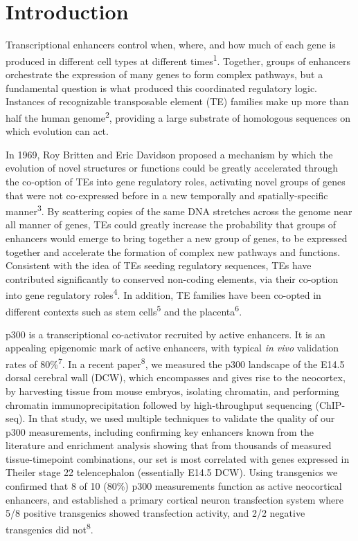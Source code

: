 \documentclass[]{article}
\begin{document}
\section{\texorpdfstring{\\
Introduction}{ Introduction}}\label{introduction}

Transcriptional enhancers control when, where, and how much of each gene
is produced in different cell types at different
times\textsuperscript{1}. Together, groups of enhancers orchestrate the
expression of many genes to form complex pathways, but a fundamental
question is what produced this coordinated regulatory logic. Instances
of recognizable transposable element (TE) families make up more than
half the human genome\textsuperscript{2}, providing a large substrate of
homologous sequences on which evolution can act.

In 1969, Roy Britten and Eric Davidson proposed a mechanism by which the
evolution of novel structures or functions could be greatly accelerated
through the co-option of TEs into gene regulatory roles, activating
novel groups of genes that were not co-expressed before in a new
temporally and spatially-specific manner\textsuperscript{3}. By
scattering copies of the same DNA stretches across the genome near all
manner of genes, TEs could greatly increase the probability that groups
of enhancers would emerge to bring together a new group of genes, to be
expressed together and accelerate the formation of complex new pathways
and functions. Consistent with the idea of TEs seeding regulatory
sequences, TEs have contributed significantly to conserved non-coding
elements, via their co-option into gene regulatory
roles\textsuperscript{4}. In addition, TE families have been co-opted in
different contexts such as stem cells\textsuperscript{5} and the
placenta\textsuperscript{6}.

p300 is a transcriptional co-activator recruited by active enhancers. It
is an appealing epigenomic mark of active enhancers, with typical
\emph{in vivo} validation rates of 80\%\textsuperscript{7}. In a recent
paper\textsuperscript{8}, we measured the p300 landscape of the E14.5
dorsal cerebral wall (DCW), which encompasses and gives rise to the
neocortex, by harvesting tissue from mouse embryos, isolating chromatin,
and performing chromatin immunoprecipitation followed by high-throughput
sequencing (ChIP-seq). In that study, we used multiple techniques to
validate the quality of our p300 measurements, including confirming key
enhancers known from the literature and enrichment analysis showing that
from thousands of measured tissue-timepoint combinations, our set is
most correlated with genes expressed in Theiler stage 22 telencephalon
(essentially E14.5 DCW). Using transgenics we confirmed that 8 of 10
(80\%) p300 measurements function as active neocortical enhancers, and
established a primary cortical neuron transfection system where 5/8
positive transgenics showed transfection activity, and 2/2 negative
transgenics did not\textsuperscript{8}.
\end{document}
